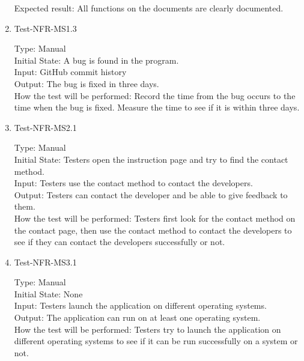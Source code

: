 \documentclass[12pt, titlepage]{article}
\begin{document}
\begin{enumerate}
Expected result: All functions on the documents are clearly documented.

\item{Test-NFR-MS1.3\\} 

Type: Manual\\

Initial State: A bug is found in the program.\\

Input: GitHub commit history\\

Output: The bug is fixed in three days.\\

How the test will be performed: Record the time from the bug occurs to the time when the bug is fixed. Measure the time to see if it is within three days. 

\item{Test-NFR-MS2.1\\}

Type: Manual\\

Initial State: Testers open the instruction page and try to find the contact method.\\

Input: Testers use the contact method to contact the developers.\\

Output: Testers can contact the developer and be able to give feedback to them.\\

How the test will be performed: Testers first look for the contact method on the contact page, then use the contact method to contact the developers to see if they can contact the developers successfully or not.  

\item{Test-NFR-MS3.1\\}

Type: Manual\\

Initial State: None\\

Input: Testers launch the application on different operating systems.\\

Output: The application can run on at least one operating system.\\

How the test will be performed: Testers try to launch the application on different operating systems to see if it can be run successfully on a system or not.  


\end{enumerate}
\end{document}
